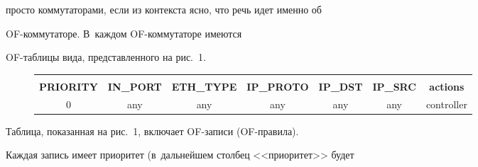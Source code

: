 просто коммутаторами, если из контекста ясно, что речь идет именно об 


OF-ком\-му\-та\-то\-ре. В~каждом OF-ком\-му\-та\-то\-ре имеются  


OF-таб\-ли\-цы вида, представленного на рис.~1.


  


  \begin{figure} %


  \begin{center}


  {\footnotesize


  {\sf


  \tabcolsep=5pt


  \begin{tabular}{|c|c|c|c|c|c|c|}


  \hline


  &&&&&&\\[-9pt]


 \textbf{PRIORITY} &  \textbf{IN\_PORT} &  \textbf{ETH\_TYPE} & 


  \textbf{IP\_PROTO} &  \textbf{IP\_DST} &  \textbf{IP\_SRC} 


&  \textbf{actions}\\


  \hline


  0& any & any & any & any& any& controller\\


  \hline


  \end{tabular}}





  \vspace*{-3pt}


  




}


  \end{center}


  \vspace*{-12pt}


  \end{figure}





  Таблица, показанная на рис.~1, включает OF-за\-пи\-си (OF-пра\-ви\-ла). 


Каждая запись имеет приоритет (в~дальнейшем столбец <<приоритет>> будет 


